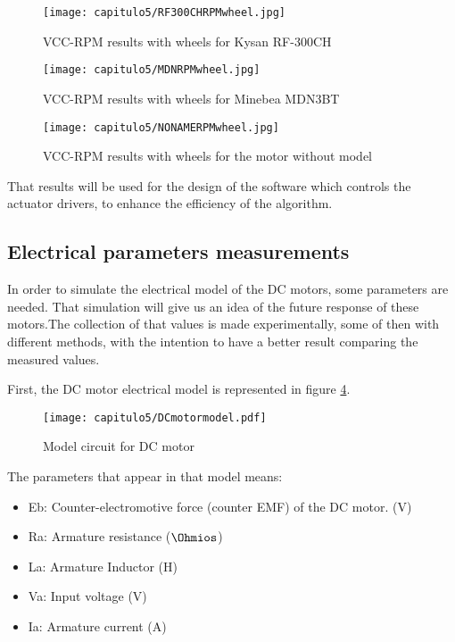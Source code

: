 \begin{figure}[H]
	\centering
		\texttt{[image: capitulo5/RF300CHRPMwheel.jpg]}
	\caption{VCC-RPM results with wheels for Kysan RF-300CH}
	\label{fig:RF300RPMwheel}
\end{figure}

\begin{figure}[H]
	\centering
		\texttt{[image: capitulo5/MDNRPMwheel.jpg]}
	\caption{VCC-RPM results with wheels for Minebea MDN3BT}
	\label{fig:MDNRPMwheel}
\end{figure}

\begin{figure}[H]
\centering
		\texttt{[image: capitulo5/NONAMERPMwheel.jpg]}
	\caption{VCC-RPM results with wheels for the motor without model}
	\label{fig:NONAMERPMwheel}
\end{figure}


That results will be used for the design of the software which controls the actuator drivers, to enhance the efficiency of the algorithm.


\subsection{Electrical parameters measurements}\label{ssec:parametersmotor}

In order to simulate the electrical model of the \acrshort{DC} motors, some parameters are needed. That simulation will give us an idea of the future response of these motors.The collection of that values is made experimentally, some of then with different methods, with the intention to have a better result comparing the measured values.


First, the \acrshort{DC} motor electrical model is represented in figure \ref{fig:DCmotormodel}.


\begin{figure}[H]
\centering
		\texttt{[image: capitulo5/DCmotormodel.pdf]}
	\caption{Model circuit for \acrshort{DC motor}}
	\label{fig:DCmotormodel}
\end{figure}


The parameters that appear in that model means:
\begin{itemize}
\item Eb: Counter-electromotive force (counter \acrshort{EMF}) of the \acrshort{DC} motor. (V)
\item Ra: Armature resistance ($\Ohmios$)
\item La: Armature Inductor (H)
\item Va: Input voltage (V)
\item Ia: Armature current (A)
\end{itemize}

